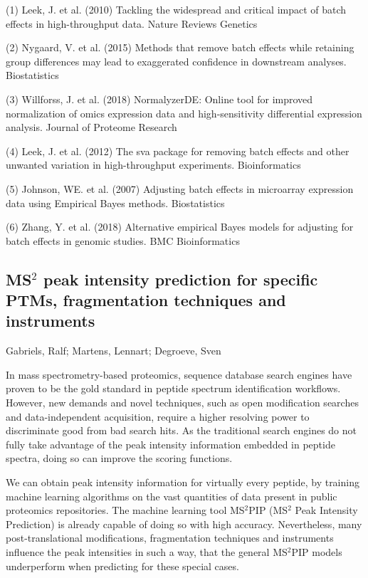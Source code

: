 {(1) Leek, J. et al. (2010) Tackling the widespread and critical impact of batch effects in high-throughput data. Nature Reviews Genetics

(2) Nygaard, V. et al. (2015) Methods that remove batch effects while retaining group differences may lead to exaggerated confidence in downstream analyses. Biostatistics

(3) Willforss, J. et al. (2018) NormalyzerDE: Online tool for improved normalization of omics expression data and high-sensitivity differential expression analysis. Journal of Proteome Research

(4) Leek, J. et al. (2012) The sva package for removing batch effects and other unwanted variation in high-throughput experiments. Bioinformatics

(5) Johnson, WE. et al. (2007) Adjusting batch effects in microarray expression data using Empirical Bayes methods. Biostatistics

(6) Zhang, Y. et al. (2018) Alternative empirical Bayes models for adjusting for batch effects in genomic studies. BMC Bioinformatics


\subsection*{\color{eubicRed} MS$^2$ peak intensity prediction for specific PTMs, fragmentation techniques and instruments}
{\color{eubicGray}Gabriels, Ralf;
Martens, Lennart;
Degroeve, Sven}

In mass spectrometry-based proteomics, sequence database search engines have proven to be the gold standard in peptide spectrum identification workflows. However, new demands and novel techniques, such as open modification searches and data-independent acquisition, require a higher resolving power to discriminate good from bad search hits. As the traditional search engines do not fully take advantage of the peak intensity information embedded in peptide spectra, doing so can improve the scoring functions.

We can obtain peak intensity information for virtually every peptide, by training machine learning algorithms on the vast quantities of data present in public proteomics repositories. The machine learning tool MS$^2$PIP (MS$^2$ Peak Intensity Prediction) is already capable of doing so with high accuracy. Nevertheless, many post-translational modifications, fragmentation techniques and instruments influence the peak intensities in such a way, that the general MS$^2$PIP models underperform when predicting for these special cases.

}
